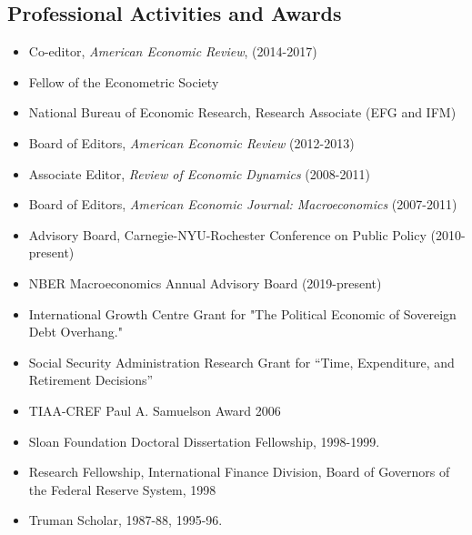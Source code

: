 \documentclass[12pt]{article}
\begin{document}
\subsection*{Professional Activities and Awards}

\begin{itemize}[left=0pt .. \parindent, label=]
\item Co-editor, \textit{American Economic Review}, (2014-2017)

\item Fellow of the Econometric Society

\item National Bureau of Economic Research, Research Associate (EFG and IFM)

\item Board of Editors, \textit{American Economic Review} (2012-2013)

\item Associate Editor, \textit{Review of Economic Dynamics} (2008-2011)

\item Board of Editors, \textit{American Economic Journal: Macroeconomics}
(2007-2011)

\item Advisory Board, Carnegie-NYU-Rochester Conference on Public Policy
(2010-present)

\item NBER Macroeconomics Annual Advisory Board (2019-present)

\item International Growth Centre Grant for "The Political Economic of
Sovereign Debt Overhang."

\item Social Security Administration Research Grant for ``Time, Expenditure,
and Retirement Decisions''

\item TIAA-CREF Paul A. Samuelson Award 2006

\item Sloan Foundation Doctoral Dissertation Fellowship, 1998-1999.

\item Research Fellowship, International Finance Division, Board of Governors of the Federal Reserve System, 1998

\item Truman Scholar, 1987-88, 1995-96.

\end{itemize}
 
 
\end{document}
